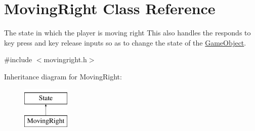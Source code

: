 \hypertarget{classMovingRight}{\section{Moving\-Right Class Reference}
\label{classMovingRight}
}


The state in which the player is moving right This also handles the responds to key press and key release inputs so as to change the state of the \hyperlink{classGameObject}{Game\-Object}.  




{\ttfamily \#include $<$movingright.\-h$>$}

Inheritance diagram for Moving\-Right\-:\begin{figure}[H]
\begin{center}
\leavevmode
\includegraphics[height=2.000000cm]{classMovingRight}
\end{center}
\end{figure}
